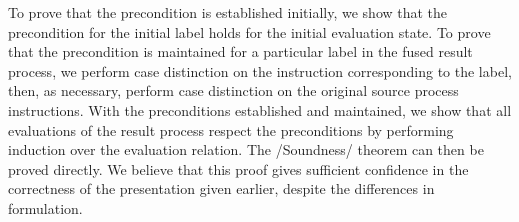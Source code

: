 To prove that the precondition is established initially, we show that the precondition for the initial label holds for the initial evaluation state.
To prove that the precondition is maintained for a particular label in the fused result process, we perform case distinction on the instruction corresponding to the label, then, as necessary, perform case distinction on the original source process instructions.
With the preconditions established and maintained, we show that all evaluations of the result process respect the preconditions by performing induction over the evaluation relation.
The \Hs/Soundness/ theorem can then be proved directly.
We believe that this proof gives sufficient confidence in the correctness of the presentation given earlier, despite the differences in formulation.

% 
